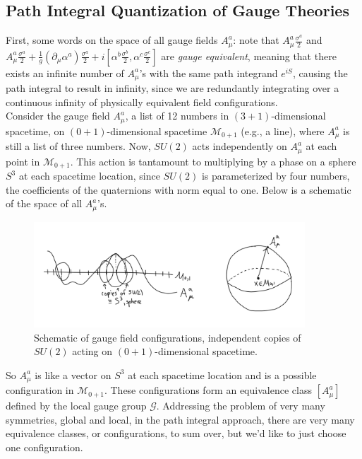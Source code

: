 \subsection*{Path Integral Quantization of Gauge Theories}

\noindent First, some words on the space of all gauge fields $A_\mu^a$: note that $A_\mu^a \frac{\sigma^a}{2}$ and $A_\mu^a \frac{\sigma^a}{2} + \frac{1}{g} (\partial_\mu \alpha^a) \frac{\sigma^a}{2} + i [\alpha^b \frac{\sigma^b}{2}, \alpha^c \frac{\sigma^c}{2}]$ are \textit{gauge equivalent}, meaning that there exists an infinite number of $A_\mu^a$'s with the same path integrand $e^{i S}$, causing the path integral to result in infinity, since we are redundantly integrating over a continuous infinity of physically equivalent field configurations. \\

\noindent Consider the gauge field $A_\mu^a$, a list of 12 numbers in $(3+1)$-dimensional spacetime, on $(0+1)$-dimensional spacetime $\mathcal{M}_{0+1}$ (e.g., a line), where $A_\mu^a$ is still a list of three numbers. Now, $SU(2)$ acts independently on $A_\mu^a$ at each point in $\mathcal{M}_{0+1}$. This action is tantamount to multiplying by a phase on a sphere $S^3$ at each spacetime location, since $SU(2)$ is parameterized by four numbers, the coefficients of the quaternions with norm equal to one. Below is a schematic of the space of all $A_\mu^a$'s. \\

\begin{figure}[H]
	\centering
	\includegraphics[width=4in]{images/su2schematic.png}
	\caption*{Schematic of gauge field configurations, independent copies of $SU(2)$ acting on $(0+1)$-dimensional spacetime.}
\end{figure}

\noindent So $A_\mu^a$ is like a vector on $S^3$ at each spacetime location and is a possible configuration in $\mathcal{M}_{0+1}$. These configurations form an equivalence class  $[A_\mu^a]$ defined by the local gauge group $\mathcal{G}$. Addressing the problem of very many symmetries, global and local,  in the path integral approach, there are very many equivalence classes, or configurations, to sum over, but we'd like to just choose one configuration. \\

